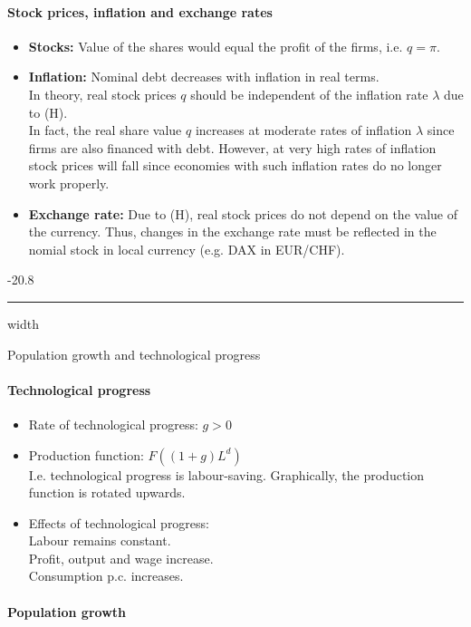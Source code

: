\documentclass[a4paper,landscape,7pt,fleqn]{scrartcl}
\makeatletter
\renewcommand{\emph}[1]{\textbf{#1}}
\renewcommand{\subsubsection}{\@startsection{subsubsection}{1}{0mm}%
{-2\baselineskip}{0.8\baselineskip}%
{\hrule depth 0.2pt width\columnwidth\vspace*{1.2em}\normalsize\bfseries}}
\makeatother
\begin{document}
\begin{multicols*}{3}
\paragraph{Stock prices, inflation and exchange rates}
\begin{itemize}
\item \emph{Stocks:} Value of the shares would equal the profit of the firms, i.e. $q = \pi$.
\item \emph{Inflation:} Nominal debt decreases with inflation in real terms. \\
In theory, real stock prices $q$ should be independent of the inflation rate $\lambda$ due to (H). \\
In fact, the real share value $q$ increases at moderate rates of inflation $\lambda$ since firms are also financed with debt.
However, at very high rates of inflation stock prices will fall since economies with such inflation rates do no longer work properly.
\item \emph{Exchange rate:} Due to (H), real stock prices do not depend on the value of the currency. Thus, changes in the exchange rate must be reflected in the nomial stock in local currency (e.g. DAX in EUR/CHF).
\end{itemize}

\subsubsection{Population growth and technological progress}

\paragraph{Technological progress}

\begin{itemize}
\item Rate of technological progress: $g > 0$
\item Production function: $F((1+g)L^d)$ \\
I.e. technological progress is labour-saving. Graphically, the production function is rotated upwards.
\item Effects of technological progress: \\
Labour remains constant. \\
Profit, output and wage increase. \\
Consumption p.c. increases.
\end{itemize}

\paragraph{Population growth}


\end{multicols*}
\end{document}
